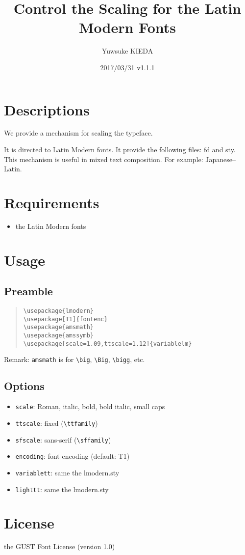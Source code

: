 \documentclass{article}
\title{Control the Scaling for the Latin Modern Fonts}
\author{Yuwsuke KIEDA}
\date{2017/03/31 v1.1.1}
\begin{document}
\maketitle

\section{Descriptions}

We provide a mechanism for scaling the typeface.

It is directed to Latin Modern fonts.
It provide the following files: fd and sty.
This mechanism is useful in mixed text composition.
For example: Japanese--Latin.

\section{Requirements}

\begin{itemize}
 \item the Latin Modern fonts
\end{itemize}

\section{Usage}

\subsection{Preamble}

\begin{quote}
\begin{verbatim}
\usepackage{lmodern}
\usepackage[T1]{fontenc}
\usepackage{amsmath}
\usepackage{amssymb}
\usepackage[scale=1.09,ttscale=1.12]{variablelm}
\end{verbatim}
\end{quote}

Remark: \texttt{amsmath} is for \verb!\big!, \verb!\Big!, \verb!\bigg!, etc.

\subsection{Options}

\begin{itemize}
 \item [\textendash] \texttt{scale}: Roman, italic, bold, bold italic, small caps
 \item [\textendash] \texttt{ttscale}: fixed (\verb!\ttfamily!)
 \item [\textendash] \texttt{sfscale}: sans-serif (\verb!\sffamily!)
 \item [\textendash] \texttt{encoding}: font encoding (default: T1)
 \item [\textendash] \texttt{variablett}: same the lmodern.sty
 \item [\textendash] \texttt{lighttt}: same the lmodern.sty
\end{itemize}


\section{License}

the GUST Font License (version 1.0)
\end{document}
